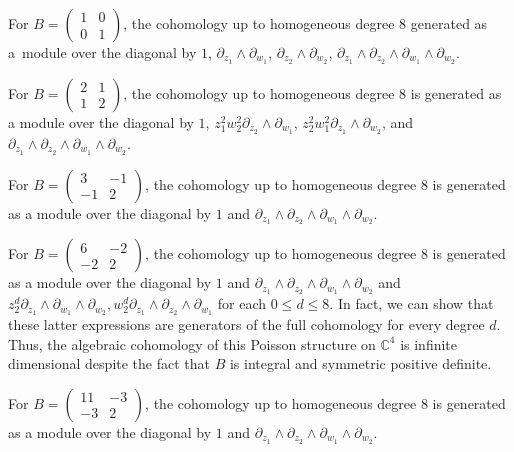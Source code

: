 \documentclass[10pt,a4paper]{amsart}
\numberwithin{equation}{section}
\begin{document}
\begin{Example}
For $B=\begin{pmatrix}1 & 0 \\ 0 & 1\end{pmatrix}$, the cohomology up to homogeneous degree $8$ generated as a~module over the diagonal by $1$, $\partial_{z_1}\wedge\partial_{w_1}$, $\partial_{z_2}\wedge\partial_{w_2}$, $\partial_{z_1}\wedge\partial_{z_2}\wedge\partial_{w_1}\wedge\partial_{w_2}$.
\end{Example}
\begin{Example}
For $B=\begin{pmatrix}2 & 1 \\ 1 & 2\end{pmatrix}$, the cohomology up to homogeneous degree $8$ is generated as a module over the diagonal by $1$, $z_1^2w_2^2\partial_{z_2}\wedge\partial_{w_1}$, $z_2^2w_1^2\partial_{z_1}\wedge\partial_{w_2}$, and $\partial_{z_1}\wedge\partial_{z_2}\wedge\partial_{w_1}\wedge\partial_{w_2}$.
\end{Example}
\begin{Example}
For $B=\begin{pmatrix}3 & -1 \\ -1 & 2\end{pmatrix}$, the cohomology up to homogeneous degree $8$ is generated as a module over the diagonal by $1$ and $\partial_{z_1}\wedge\partial_{z_2}\wedge\partial_{w_1}\wedge\partial_{w_2}$.
\end{Example}
\begin{Example}
For $B=\begin{pmatrix}6 & -2 \\ -2 & 2\end{pmatrix}$, the cohomology up to homogeneous degree $8$ is generated as a module over the diagonal by $1$ and $\partial_{z_1}\wedge\partial_{z_2}\wedge\partial_{w_1}\wedge\partial_{w_2}$ and $z_2^d\partial_{z_1}\wedge\partial_{w_1}\wedge\partial_{w_2},w_2^d\partial_{z_1}\wedge\partial_{z_2}\wedge\partial_{w_1}$ for each $0\le d\le 8$. In fact, we can show that these latter expressions are generators of the full cohomology for every degree $d$. Thus, the algebraic cohomology of this Poisson structure on ${\mathbb C}^4$ is inf\/inite dimensional despite the fact that $B$ is integral and symmetric positive def\/inite.
\end{Example}
\begin{Example}
For $B=\begin{pmatrix}11 & -3 \\ -3 & 2\end{pmatrix}$, the cohomology up to homogeneous degree $8$ is generated as a module over the diagonal by $1$ and $\partial_{z_1}\wedge\partial_{z_2}\wedge\partial_{w_1}\wedge\partial_{w_2}$.
\end{Example}
\end{document}
